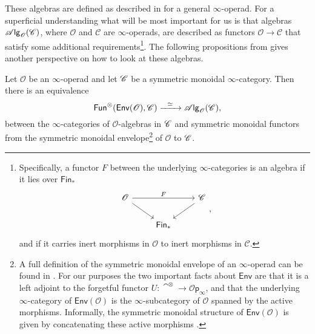 \documentclass[../text]{subfiles}
\begin{document}
\begin{remark}
    These algebras are defined as described in \cite{lurie_ha} for a general $\infty$-operad. For a superficial understanding what will be most important for us is that algebras $\mathscr{A} \mathsf{lg}_{\mathscr{O}} (\mathscr{C})$, where $\mathscr{O}$ and $\mathscr{C}$ are $\infty$-operads, are described as functors $\mathscr{O} \xrightarrow{} \mathscr{C}$ that satisfy some additional requirements\footnote{Specifically, a functor $F$ between the underlying $\infty$-categories is an algebra if it lies over $\mathsf{Fin}_*$
    \begin{equation}
        \begin{tikzcd}[ampersand replacement=\&]
            \mathscr{O} \arrow[rr, "F"] \arrow[rd] \& \& \mathscr{C} \arrow[ld] \\
            \& \mathsf{Fin}_* \&
        \end{tikzcd},
    \end{equation}
    and if it carries inert morphisms in $\mathscr{O}$ to inert morphisms in $\mathscr{C}$.
    }. The following propositions from \cite{lurie_ha} gives another perspective on how to look at these algebras.
\end{remark}

\begin{proposition}
    Let $\mathscr{O}$ be an $\infty$-operad and let $\mathscr{C}$ be a symmetric monoidal $\infty$-category. Then there is an equivalence
    \begin{equation}
        \mathsf{Fun}^\otimes (\mathsf{Env}(\mathscr{O}), \mathscr{C}) \xrightarrow{\ \ \simeq \ \ } \mathscr{A} \mathsf{lg}_{\mathscr{O}} (\mathscr{C}),
    \end{equation}
    between the $\infty$-categories of $\mathscr{O}$-algebras in $\mathscr{C}$ and symmetric monoidal functors from the symmetric monoidal envelope\footnote{A full definition of the symmetric monoidal envelope of an $\infty$-operad can be found in \cite[sec.2.2.4]{lurie_ha}. For our purposes the two important facts about $\mathsf{Env}$ are that it is a left adjoint to the forgetful functor $U: \cat^\otimes \xrightarrow{} \mathscr{O}\mathsf{p}_{\infty}$, and that the underlying $\infty$-category of $\mathsf{Env} (\mathscr{O})$ is the $\infty$-subcategory of $\mathscr{O}$ spanned by the active morphisms. Informally, the symmetric monoidal structure of $\mathsf{Env}(\mathscr{O})$ is given by concatenating these active morphisms \cite[rem.2.2.4.6]{lurie_ha}.} of $\mathscr{O}$ to $\mathscr{C}$.
\end{proposition}
\end{document}
